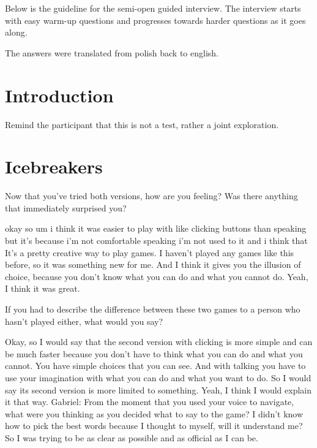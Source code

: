 

Below is the guideline for the semi-open guided interview. 
The interview starts with easy warm-up questions and progresses towards harder questions as it goes along. 

The answers were translated from polish back to english.

\section{Introduction}
Remind the participant that this is not a test, rather a joint exploration.

\section{Icebreakers}

\begin{QandA}
   \item Now that you’ve tried both versions, how are you feeling? Was there anything that immediately surprised you?
         \begin{answered}
               okay so um i think it was easier to play with like clicking buttons than speaking but it's because i'm not comfortable speaking i'm not used to it and i think that
               It's a pretty creative way to play games.
               I haven't played any games like this before, so it was something new for me.
               And I think it gives you the illusion of choice, because you don't know what you can do and what you cannot do.
               Yeah, I think it was great.
            \end{answered}

   \item If you had to describe the difference between these two games to a person who hasn't played either, what would you say?
         \begin{answered}
            Okay, so I would say that the second version with clicking is more simple and can be much faster because you don't have to think what you can do and what you cannot.
            You have simple choices that you can see.
            And with talking you have to use your imagination with what you can do and what you want to do.
            So I would say its second version is more limited to something.
            Yeah, I think I would explain it that way.
            Gabriel: From the moment that you used your voice to navigate, what were you thinking as you decided what to say to the game?
            I didn't know how to pick the best words because I thought to myself, will it understand me?
            So I was trying to be as clear as possible and as official as I can be.
         \end{answered}
\end{QandA}




